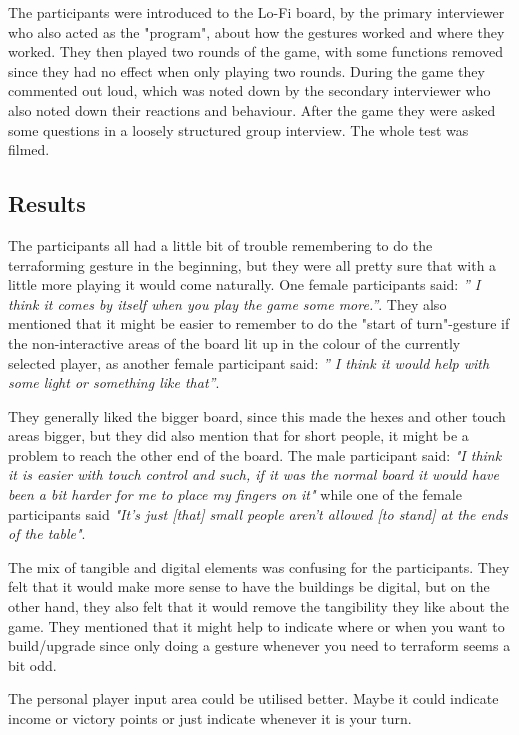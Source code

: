 The participants were introduced to the Lo-Fi board, by the primary interviewer who also acted as the "program", about how the gestures worked and where they worked. They then played two rounds of the game, with some functions removed since they had no effect when only playing two rounds. During the game they commented out loud, which was noted down by the secondary interviewer who also noted down their reactions and behaviour. 
After the game they were asked some questions in a loosely structured group interview. 
The whole test was filmed.

\subsection{Results} 
The participants all had a little bit of trouble remembering to do the terraforming gesture in the beginning, but they were all pretty sure that with a little more playing it would come naturally. One female participants said: \textit{” I think it comes by itself when you play the game some more.”}. They also mentioned that it might be easier to remember to do the "start of turn"-gesture if the non-interactive areas of the board lit up in the colour of the currently selected player, as another female participant said: \textit{” I think it would help with some light or something like that”}.


They generally liked the bigger board, since this made the hexes and other touch areas bigger, but they did also mention that for short people, it might be a problem to reach the other end of the board. The male participant said: \textit{"I think it is easier with touch control and such, if it was the normal board it would have been a bit harder for me to place my fingers on it"} while one of the female participants said \textit{"It’s just [that] small people aren’t allowed [to stand] at the ends of the table"}.


The mix of tangible and digital elements was confusing for the participants. They felt that it would make more sense to have the buildings be digital, but on the other hand, they also felt that it would remove the tangibility they like about the game. They mentioned that it might help to indicate where or when you want to build/upgrade since only doing a gesture whenever you need to terraform seems a bit odd. 

The personal player input area could be utilised better. Maybe it could indicate income or victory points or just indicate whenever it is your turn. 

